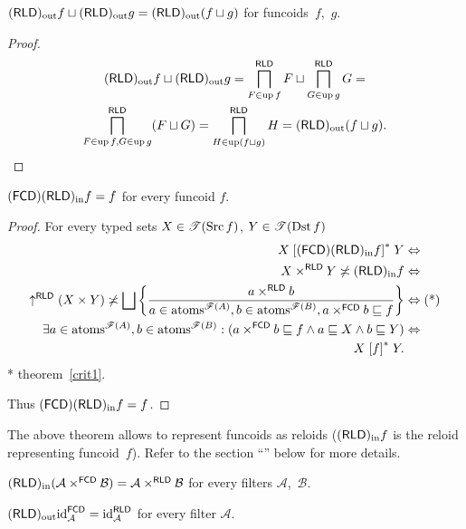 \begin{prop}
$(\mathsf{RLD})_{\mathrm{out}} f \sqcup (\mathsf{RLD})_{\mathrm{out}} g = (\mathsf{RLD})_{\mathrm{out}}(f \sqcup g)$
for funcoids~$f$,~$g$.
\end{prop}

\begin{proof}
\begin{multline*}
(\mathsf{RLD})_{\mathrm{out}} f \sqcup (\mathsf{RLD})_{\mathrm{out}} g = \bigsqcap^{\mathsf{RLD}}_{F \in \operatorname{up} f} F \sqcup
\bigsqcap^{\mathsf{RLD}}_{G \in \operatorname{up} g} G =\\ \bigsqcap^{\mathsf{RLD}}_{F \in
\operatorname{up} f, G \in \operatorname{up} g} (F \sqcup G) = \bigsqcap^{\mathsf{RLD}}_{H \in
\operatorname{up} (f \sqcup g)} H = (\mathsf{RLD})_{\mathrm{out}} (f \sqcup g).
\end{multline*}
\end{proof}

\begin{thm}
$(\mathsf{FCD})(\mathsf{RLD})_{\mathrm{in}} f=f$ for every funcoid $f$.\end{thm}
\begin{proof}
For every typed sets $X\in\mathscr{T}(\operatorname{Src} f)$, $Y\in\mathscr{T}(\operatorname{Dst} f)$
\begin{align*}
X\rsuprel{\tofcd\torldin f}Y & \Leftrightarrow\\
X\times^{\mathsf{RLD}}Y\nasymp\torldin f & \Leftrightarrow\\
\uparrow^{\mathsf{RLD}}(X\times Y)\nasymp\bigsqcup\setcond{a\times^{\mathsf{RLD}}b}{a\in\atoms^{\mathscr{F}(A)},b\in\atoms^{\mathscr{F}(B)},a\times^{\mathsf{FCD}}b\sqsubseteq f} & \Leftrightarrow\text{(*)}\\
\exists a\in\atoms^{\mathscr{F}(A)},b\in\atoms^{\mathscr{F}(B)}:(a\times^{\mathsf{FCD}}b\sqsubseteq f\land a\sqsubseteq X\land b\sqsubseteq Y) & \Leftrightarrow\\
X\rsuprel fY.
\end{align*}
{*} theorem~\ref{crit1}.

Thus $(\mathsf{FCD})(\mathsf{RLD})_{\mathrm{in}} f=f$.\end{proof}
\begin{rem}
The above theorem allows to represent funcoids as reloids ($(\mathsf{RLD})_{\mathrm{in}} f$ is the reloid representing funcoid~$f$). Refer to
the section ``'' below for more details.\end{rem}
\begin{obvious}
$(\mathsf{RLD})_{\mathrm{in}}(\mathcal{A}\times^{\mathsf{FCD}}\mathcal{B})=\mathcal{A}\times^{\mathsf{RLD}}\mathcal{B}$
for every filters $\mathcal{A}$,~$\mathcal{B}$.\end{obvious}
\begin{conjecture}
$(\mathsf{RLD})_{\mathrm{out}}{\operatorname{id}}_{\mathcal{A}}^{\mathsf{FCD}}={\operatorname{id}}_{\mathcal{A}}^{\mathsf{RLD}}$
for every filter $\mathcal{A}$.\end{conjecture}
